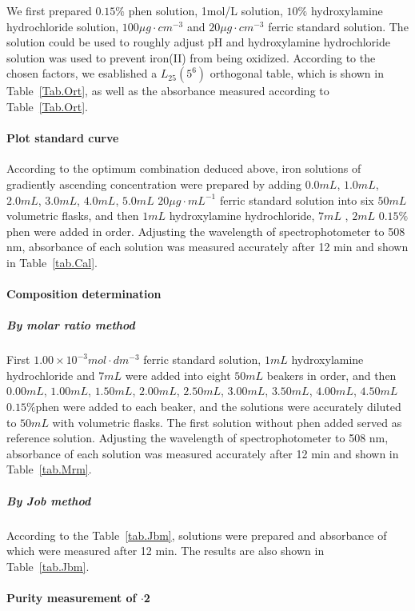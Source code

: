 \documentclass[journal=jacsat,manuscript=article]{achemso}
\begin{document}
We first prepared $0.15\%$ phen solution, 1mol/L  solution, $10\%$ hydroxylamine hydrochloride solution, $100\mu g\cdot cm^{-3}$  and $20\mu g\cdot cm^{-3}$ ferric standard solution. The  solution could be used to roughly adjust pH and hydroxylamine hydrochloride solution was used to prevent iron(II) from being oxidized. According to the chosen factors, we esablished a $L_{25}(5^6)$ orthogonal table, which is shown in Table~\ref{Tab.Ort}, as well as the absorbance measured according to Table~\ref{Tab.Ort}.

\paragraph{Plot standard curve}
According to the optimum combination deduced above, iron solutions of gradiently ascending concentration were prepared by adding $0.0mL$, $1.0mL$, $2.0mL$, $3.0mL$, $4.0mL$, $5.0mL$ $20\mu g\cdot mL^{-1}$ ferric standard solution into six $50mL$ volumetric flasks, and then $1mL$ hydroxylamine hydrochloride, $7mL$ , $2mL$ $0.15\%$phen were added in order. Adjusting the wavelength of spectrophotometer to 508 nm, absorbance of each solution was measured accurately after 12 min and shown in Table~\ref{tab.Cal}.

\paragraph{Composition determination}

\subparagraph{By molar ratio method}
First $1.00\times10^{-3} mol\cdot dm^{-3}$ ferric standard solution, $1mL$ hydroxylamine hydrochloride and $7mL$ were added into eight $50mL$ beakers in order, and then $0.00mL$, $1.00mL$, $1.50mL$, $2.00mL$, $2.50mL$, $3.00mL$, $3.50mL$, $4.00mL$, $4.50mL$ $0.15\%$phen were added to each beaker, and the solutions were accurately diluted to $50mL$ with volumetric flasks. The first solution without phen added served as reference solution. Adjusting the wavelength of spectrophotometer to 508 nm, absorbance of each solution was measured accurately after 12 min and shown in Table~\ref{tab.Mrm}.

\subparagraph{By Job method}
According to the Table~\ref{tab.Jbm}, solutions were prepared and absorbance of which were measured after 12 min. The results are also shown in Table~\ref{tab.Jbm}.
\newpage
\paragraph{Purity measurement of $\cdot$2}
\end{document}
